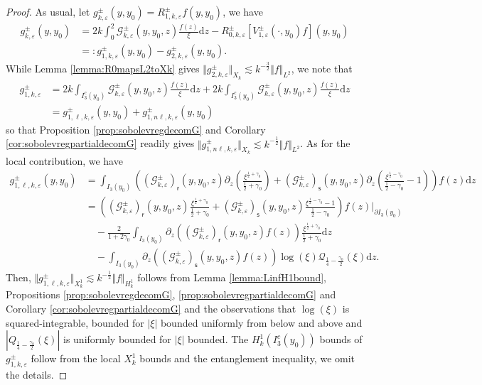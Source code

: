 \documentclass[11pt,reqno]{amsproc}
\theoremstyle{definition}
\numberwithin{equation}{section}
\newcommand{\G}{{\mathcal{G}}}
\newcommand{\sr}{{\mathsf{r}}}
\newcommand{\s}{{\mathsf{s}}}
\renewcommand{\d}{\mathrm{d}}
\newcommand{\ep}{\varepsilon}
\begin{document}
\begin{proof}
As usual, let $g_{k,\ep}^\pm(y,y_0) = R_{1,k,\ep}^\pm f(y,y_0)$, we have
\begin{align*}
g_{k,\ep}^\pm(y,y_0) &= 2k\int_0^2 \G_{k,\ep}^\pm(y,y_0,z) \frac{f(z)}{\xi}\d z - R_{0,k,\ep}^\pm \left[ V_{1,\ep}^\pm(\cdot, y_0) f \right](y,y_0)\\
&=:g_{1,k,\ep}^\pm(y,y_0) - g_{2,k,\ep}^\pm(y,y_0).
\end{align*}
While Lemma \ref{lemma:R0mapsL2toXk} gives $\Vert g_{2,k,\ep}^\pm \Vert_{X_k}\lesssim k^{-\frac32}\Vert f \Vert_{L^2}$, we note that
\begin{align*}
g_{1,k,\ep}^\pm &= 2k \int_{I_3^c(y_0)} \G_{k,\ep}^\pm(y,y_0,z) \frac{f(z)}{\xi}\d z  + 2k \int_{I_3^c(y_0)} \G_{k,\ep}^\pm(y,y_0,z) \frac{f(z)}{\xi}\d z \\
&=g_{1,\ell,k,\ep}^\pm(y,y_0) + g_{1,n\ell,k,\ep}^\pm(y,y_0)
\end{align*}
so that Proposition \ref{prop:sobolevregdecomG} and Corollary \ref{cor:sobolevregpartialdecomG} readily gives $\Vert g_{1,n\ell,k,\ep}^\pm\Vert_{X_k}\lesssim k^{-\frac12}\Vert f \Vert_{L^2}$. As for the local contribution, we have 
\begin{align*}
g_{1,\ell,k,\ep}^\pm(y,y_0) &= \int_{I_3(y_0)} \left( \left(\G_{k,\ep}^\pm \right)_\sr (y,y_0,z) \partial_z \left( \frac{\xi^{\frac12+\gamma_0}}{\frac12+\gamma_0} \right) + \left(\G_{k,\ep}^\pm \right)_\s (y,y_0,z) \partial_z \left( \frac{\xi^{\frac12-\gamma_0}}{\frac12-\gamma_0}-1 \right) \right) f(z) \d z \\
&=\left( \left(\G_{k,\ep}^\pm \right)_\sr (y,y_0,z)  \frac{\xi^{\frac12+\gamma_0}}{\frac12+\gamma_0} + \left(\G_{k,\ep}^\pm \right)_\s (y,y_0,z)  \frac{\xi^{\frac12-\gamma_0}-1}{\frac12-\gamma_0}  \right) f(z) \Big|_{\partial I_3(y_0)} \\
&\quad - \frac{2}{1+2\gamma_0}\int_{I_3(y_0)} \partial_z \left ( \left(\G_{k,\ep}^\pm \right)_\sr (y,y_0,z) f(z) \right)\frac{\xi^{\frac12+\gamma_0}}{\frac12+\gamma_0} \d z \\
&\quad - \int_{I_3(y_0)} \partial_z \left ( \left(\G_{k,\ep}^\pm \right)_\s (y,y_0,z) f(z) \right)\log(\xi)\mathcal{Q}_{\frac14-\frac{\gamma_0}{2}}(\xi) \d z.
\end{align*}
Then,  $\Vert g_{1,\ell,k ,\ep}^\pm \Vert_{X_k^1}\lesssim k^{-\frac12}\Vert f\Vert_{H_k^1} $ follows from Lemma \ref{lemma:LinfH1bound}, Propositions \ref{prop:sobolevregdecomG},  \ref{prop:sobolevregpartialdecomG} and Corollary \ref{cor:sobolevregpartialdecomG} and the observations that $\log(\xi)$ is squared-integrable, bounded for $|\xi|$ bounded uniformly from below and above and $|Q_{\frac14-\frac{\gamma_0}{2}}(\xi)|$ is uniformly bounded for $|\xi|$ bounded. The $H_k^1(I_3^c(y_0))$ bounds of $g_{1,k,\ep}^\pm$ follow from the local $X_k^1$ bounds and the entanglement inequality, we omit the details.
\end{proof}
\end{document}
